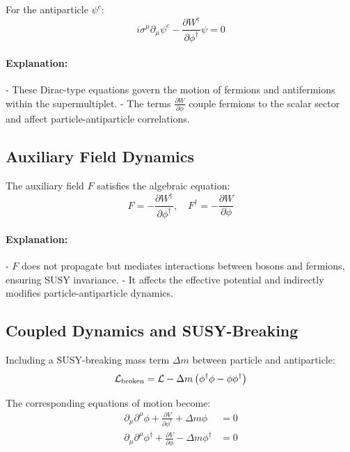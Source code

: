\documentclass[12pt,a4paper]{article}
\begin{document}
For the antiparticle \(\psi^c\):
\begin{equation}
i \sigma^\mu \partial_\mu \psi^c - \frac{\partial W^\dagger}{\partial \phi^\dagger} \psi = 0
\end{equation}

\paragraph{Explanation:}  
- These Dirac-type equations govern the motion of fermions and antifermions within the supermultiplet.  
- The terms \(\frac{\partial W}{\partial \phi}\) couple fermions to the scalar sector and affect particle-antiparticle correlations.

\subsection{Auxiliary Field Dynamics}

The auxiliary field \(F\) satisfies the algebraic equation:
\begin{equation}
F = - \frac{\partial W^\dagger}{\partial \phi^\dagger}, \quad F^\dagger = - \frac{\partial W}{\partial \phi}
\end{equation}

\paragraph{Explanation:}  
- \(F\) does not propagate but mediates interactions between bosons and fermions, ensuring SUSY invariance.  
- It affects the effective potential and indirectly modifies particle-antiparticle dynamics.

\subsection{Coupled Dynamics and SUSY-Breaking}

Including a SUSY-breaking mass term \(\Delta m\) between particle and antiparticle:
\begin{equation}
\mathcal{L}_{\rm broken} = \mathcal{L} - \Delta m \left( \phi^\dagger \phi - \phi \phi^\dagger \right)
\end{equation}

The corresponding equations of motion become:
\begin{align}
\partial_\mu \partial^\mu \phi + \frac{\partial V}{\partial \phi^\dagger} + \Delta m \phi &= 0 \\
\partial_\mu \partial^\mu \phi^\dagger + \frac{\partial V}{\partial \phi} - \Delta m \phi^\dagger &= 0
\end{align}
\end{document}
